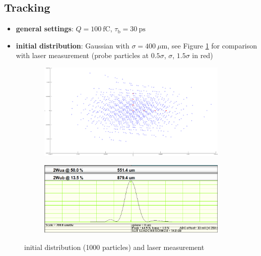 \subsection{Tracking}
\begin{itemize}
   \item \textbf{general settings}: $Q=100\ \mathrm{fC}$, $\tau_\mathrm{b}=30\ \mathrm{ps}$
   \item \textbf{initial distribution}: Gaussian with $\sigma=400\ \mu\mathrm{m}$, see Figure \ref{fig:generator} for comparison with laser measurement (probe particles at $0.5\sigma$, $\sigma$, $1.5\sigma$ in red)
\end{itemize}

\begin{center}
\begin{figure}[H]
   \begin{subfigure}{0.45\textwidth}
      \includegraphics[width=\textwidth]{fig/generator}
   \end{subfigure}
   \begin{subfigure}{0.45\textwidth}
      \includegraphics[width=\textwidth]{fig/laser}
   \end{subfigure}
   \caption{initial distribution (1000 particles) and laser measurement}
   \label{fig:generator}
\end{figure}
\end{center}

